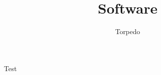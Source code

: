 \documentclass[a4paper,10pt]{article}
\title{Software}
\author{Torpedo}
\begin{document}
		\maketitle
		Test
\end{document}
